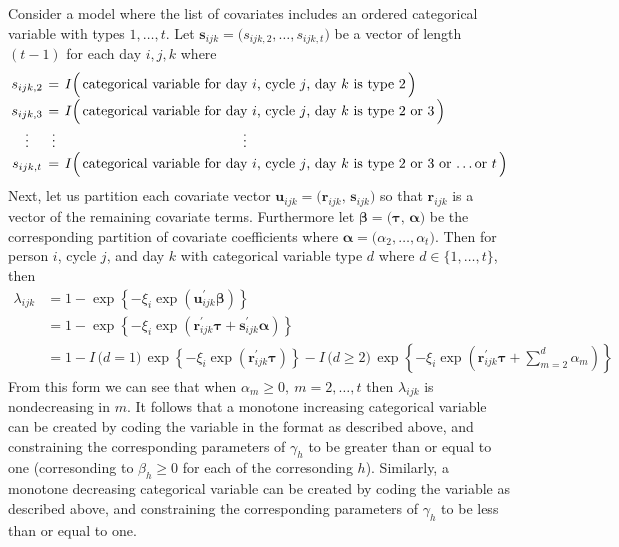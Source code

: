 \documentclass[11pt]{article}
\renewcommand{\vec}{\boldsymbol}
\newcommand{\ind}{I}
\begin{document}
Consider a model where the list of covariates includes an ordered categorical variable with types $1,\dots,t$.  Let $\vec{s}_{ijk} = \big( s_{ijk,2}, \dots, s_{ijk,t} \big)$ be a vector of length $(t-1)$ for each day $i,j,k$ where
\[ \arraycolsep=2pt \begin{array}{ccl}
s_{ijk,2} & = & I\Big(\, \text{categorical variable for day $i$, cycle $j$, day $k$ is type 2} \,\Big) \\[1ex]
s_{ijk,3} & = & I\Big(\, \text{categorical variable for day $i$, cycle $j$, day $k$ is type 2 or 3} \,\Big) \\[1ex]
\vdots & \vdots & \hspace{45mm} \vdots \\
s_{ijk,t} & = & I\Big(\, \text{categorical variable for day $i$, cycle $j$, day $k$ is type 2 or 3 or \dots or $t$} \,\Big)
\end{array} \]
Next, let us partition each covariate vector $\vec{u}_{ijk} = \big(\vec{r}_{ijk},\,  \vec{s}_{ijk}\big)$ so that $\vec{r}_{ijk}$ is a vector of the remaining covariate terms.  Furthermore let $\vec{\beta} = \big( \vec{\tau},\, \vec{\alpha} \big)$ be the corresponding partition of covariate coefficients where $\vec{\alpha} = \big(\alpha_2,\dots,\alpha_t\big)$.  Then for person $i$, cycle $j$, and day $k$ with categorical variable type $d$ where $d \in \{1,\dots,t\}$, then
\begin{align*}
\lambda_{ijk} &= 1 - \exp\left\{ -\xi_i \exp\left( \vec{u}_{ijk}^\prime \vec{\beta} \right) \right\} \\[1ex]
&= 1 - \exp\left\{ -\xi_i \exp\left( \vec{r}_{ijk}^\prime \vec{\tau} + \vec{s}_{ijk}^\prime \vec{\alpha} \right) \right\} \\
&= 1 - \ind\,\big( d = 1 \big)\, \exp\left\{ -\xi_i \exp\left( \vec{r}_{ijk}^\prime \vec{\tau} \right) \right\} - \ind\,\big( d \geq 2 \big)\, \exp\left\{ -\xi_i \exp\left( \vec{r}_{ijk}^\prime \vec{\tau} + \sum_{m=2}^d \alpha_m \right) \right\}
\end{align*}
From this form we can see that when $\alpha_m \geq 0,~ m=2,\dots,t$ then $\lambda_{ijk}$ is nondecreasing in $m$.  It follows that a monotone increasing categorical variable can be created by coding the variable in the format as described above, and constraining the corresponding parameters of $\gamma_h$ to be greater than or equal to one (corresonding to $\beta_h \geq 0$ for each of the corresonding $h$).  Similarly, a monotone decreasing categorical variable can be created by coding the variable as described above, and constraining the corresponding parameters of $\gamma_h$ to be less than or equal to one.
\end{document}

